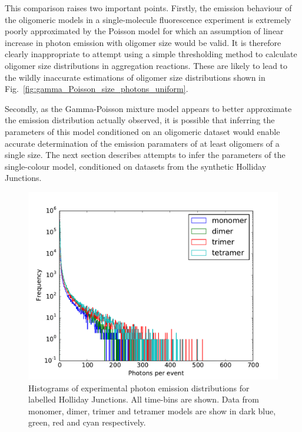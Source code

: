 This comparison raises two important points. Firstly, the emission behaviour of the oligomeric models in a single-molecule fluorescence experiment is extremely poorly approximated by the Poisson model for which an assumption of linear increase in photon emission with oligomer size would be valid. It is therefore clearly inappropriate to attempt using a simple thresholding method to calculate oligomer size distributions in aggregation reactions. These are likely to lead to the wildly inaccurate estimations of oligomer size distributions shown in Fig.~\ref{fig:gamma_Poisson_size_photons_uniform}.

Secondly, as the Gamma-Poisson mixture model appears to better approximate the emission distribution actually observed, it is possible that inferring the parameters of this model conditioned on an oligomeric dataset would enable accurate determination of the emission paramaters of at least oligomers of a single size. The next section describes attempts to infer the parameters of the single-colour model, conditioned on datasets from the synthetic Holliday Junctions.  

\begin{figure}
   \begin{center}
      \includegraphics*[clip=true, width=6in]{sizing/Holliday_Junctions.pdf}
      \caption{Histograms of experimental photon emission distributions for labelled Holliday Junctions. All time-bins are shown. Data from monomer, dimer, trimer and tetramer models are show in dark blue, green, red and cyan respectively.}
      \label{fig:HJ_oligomers}
   \end{center}
\end{figure}

